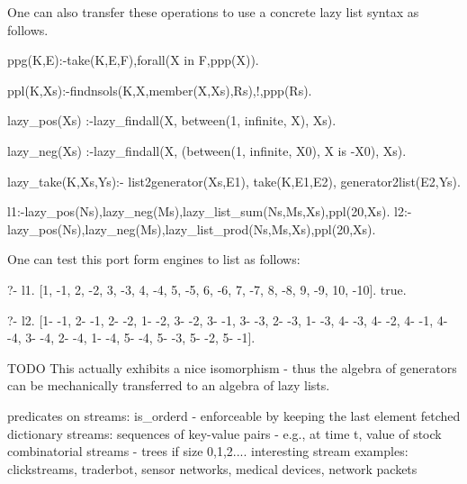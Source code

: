 \documentclass{new_tlp}
\begin{document}
One can also transfer these operations to use a concrete lazy list syntax as follows.

\begin{code}

ppg(K,E):-take(K,E,F),forall(X in F,ppp(X)).

ppl(K,Xs):-findnsols(K,X,member(X,Xs),Rs),!,ppp(Rs).

lazy_pos(Xs) :-lazy_findall(X, between(1, infinite, X), Xs).

lazy_neg(Xs) :-lazy_findall(X, (between(1, infinite, X0), X is -X0), Xs).
  
lazy_take(K,Xs,Ys):-
   list2generator(Xs,E1),
   take(K,E1,E2),
   generator2list(E2,Ys).

   
l1:-lazy_pos(Ns),lazy_neg(Ms),lazy_list_sum(Ns,Ms,Xs),ppl(20,Xs).
l2:-lazy_pos(Ns),lazy_neg(Ms),lazy_list_prod(Ns,Ms,Xs),ppl(20,Xs).  
  
\end{code}

One can test this port form engines to list as follows:

\begin{codex}
?- l1.
[1, -1, 2, -2, 3, -3, 4, -4, 5, -5, 6, -6, 7, -7, 8, -8, 9, -9, 10, -10].
true.

?- l2.
[1- -1, 2- -1, 2- -2, 1- -2, 3- -2, 3- -1, 3- -3, 2- -3, 1- -3, 4- -3, 4- -2, 4- -1, 4- -4, 3- -4, 2- -4, 1- -4, 5- -4, 5- -3, 5- -2, 5- -1].
\end{codex}

{\Large TODO} This actually exhibits a nice isomorphism - thus the algebra of generators can be mechanically transferred to an algebra of lazy lists.

\BI
\I predicates on streams: is\_orderd - enforceable by keeping the last element fetched
\I dictionary streams: sequences of key-value pairs - e.g.,  at time t, value of stock
\I combinatorial streams - trees if size 0,1,2....
\I interesting stream examples: clickstreams, traderbot, sensor networks, 
medical devices, network packets
\EI
\end{document}
